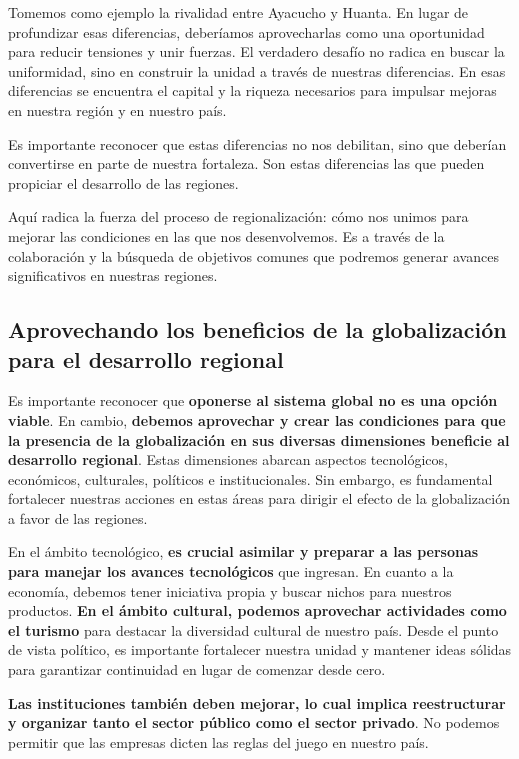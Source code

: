 \documentclass[
  letterpaper,
  DIV=11,
  numbers=noendperiod]{scrartcl}
\begin{document}
Tomemos como ejemplo la rivalidad entre Ayacucho y Huanta. En lugar de
profundizar esas diferencias, deberíamos aprovecharlas como una
oportunidad para reducir tensiones y unir fuerzas. El verdadero desafío
no radica en buscar la uniformidad, sino en construir la unidad a través
de nuestras diferencias. En esas diferencias se encuentra el capital y
la riqueza necesarios para impulsar mejoras en nuestra región y en
nuestro país.

Es importante reconocer que estas diferencias no nos debilitan, sino que
deberían convertirse en parte de nuestra fortaleza. Son estas
diferencias las que pueden propiciar el desarrollo de las regiones.

Aquí radica la fuerza del proceso de regionalización: cómo nos unimos
para mejorar las condiciones en las que nos desenvolvemos. Es a través
de la colaboración y la búsqueda de objetivos comunes que podremos
generar avances significativos en nuestras regiones.

\hypertarget{aprovechando-los-beneficios-de-la-globalizaciuxf3n-para-el-desarrollo-regional}{%
\subsection{Aprovechando los beneficios de la globalización para el
desarrollo
regional}\label{aprovechando-los-beneficios-de-la-globalizaciuxf3n-para-el-desarrollo-regional}}

Es importante reconocer que \textbf{oponerse al sistema global no es una
opción viable}. En cambio, \textbf{debemos aprovechar y crear las
condiciones para que la presencia de la globalización en sus diversas
dimensiones beneficie al desarrollo regional}. Estas dimensiones abarcan
aspectos tecnológicos, económicos, culturales, políticos e
institucionales. Sin embargo, es fundamental fortalecer nuestras
acciones en estas áreas para dirigir el efecto de la globalización a
favor de las regiones.

En el ámbito tecnológico, \textbf{es crucial asimilar y preparar a las
personas para manejar los avances tecnológicos} que ingresan. En cuanto
a la economía, debemos tener iniciativa propia y buscar nichos para
nuestros productos. \textbf{En el ámbito cultural, podemos aprovechar
actividades como el turismo} para destacar la diversidad cultural de
nuestro país. Desde el punto de vista político, es importante fortalecer
nuestra unidad y mantener ideas sólidas para garantizar continuidad en
lugar de comenzar desde cero.

\textbf{Las instituciones también deben mejorar, lo cual implica
reestructurar y organizar tanto el sector público como el sector
privado}. No podemos permitir que las empresas dicten las reglas del
juego en nuestro país.
\end{document}
